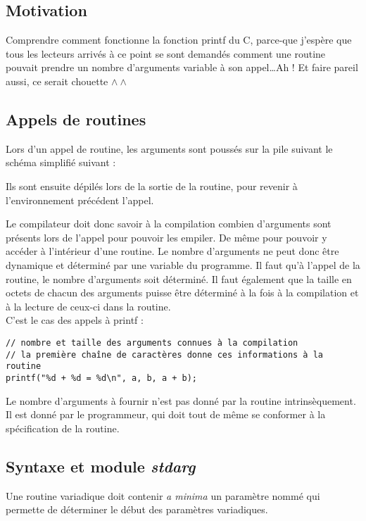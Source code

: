 \documentclass[../../../main.tex]{subfiles}
\begin{document}
\subsection{Motivation}
Comprendre comment fonctionne la fonction \textsf{printf} du C, parce-que j'espère que tous les lecteurs arrivés à ce point se sont demandés comment une routine pouvait prendre un nombre d'arguments variable à son appel\dots Ah ! Et faire pareil aussi, ce serait chouette $\wedge\wedge$
\subsection{Appels de routines}
Lors d'un appel de routine, les arguments sont poussés sur la pile suivant le schéma simplifié suivant :

\begin{minipage}{\textwidth}
	\begin{center}
		\hspace{2.5cm}
	\end{center}
\end{minipage} 

Ils sont ensuite dépilés lors de la sortie de la routine, pour revenir à l'environnement précédent l'appel.

Le compilateur doit donc savoir à la compilation combien d'arguments sont présents lors de l'appel pour pouvoir les empiler. De même pour pouvoir y accéder à l'intérieur d'une routine. Le nombre d'arguments ne peut donc être dynamique et déterminé par une variable du programme. Il faut qu'à l'appel de la routine, le nombre d'arguments soit déterminé. Il faut également que la taille en octets de chacun des arguments puisse être déterminé à la fois à la compilation et à la lecture de ceux-ci dans la routine. \\
C'est le cas des appels à \textsf{printf} :
\begin{verbatim}
// nombre et taille des arguments connues à la compilation
// la première chaîne de caractères donne ces informations à la routine
printf("%d + %d = %d\n", a, b, a + b); 
\end{verbatim}
Le nombre d'arguments à fournir n'est pas donné par la routine intrinsèquement. Il est donné par le programmeur, qui doit tout de même se conformer à la spécification de la routine.
\subsection{Syntaxe et module \textit{stdarg}}
Une routine variadique doit contenir \textit{a minima} un paramètre nommé qui permette de déterminer le début des paramètres variadiques.
\end{document}
